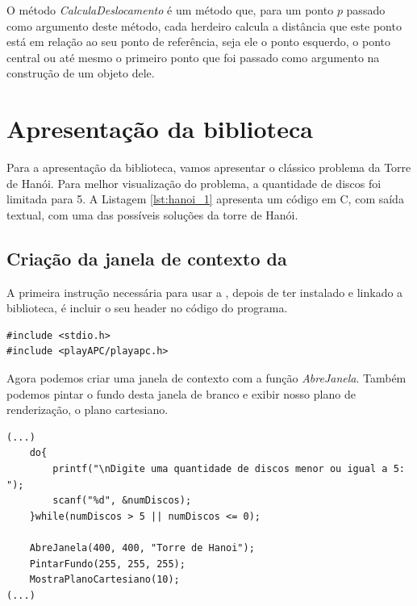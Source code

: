 O método \emph{CalculaDeslocamento} é um método que, para um ponto $p$ passado como argumento deste método, cada herdeiro calcula a distância que este ponto está em relação ao seu ponto de referência, seja ele o ponto esquerdo, o ponto central ou até mesmo o primeiro ponto que foi passado como argumento na construção de um objeto dele.






















\section{Apresentação da biblioteca} \label{sec:apresentacao}
Para a apresentação da biblioteca, vamos apresentar o clássico problema da Torre de Hanói. Para melhor visualização do problema, a quantidade de discos foi limitada para 5. A Listagem \ref{lst:hanoi_1} apresenta um código em C, com saída textual, com uma das possíveis soluções da torre de Hanói.

%


\subsection{Criação da janela de contexto da \playAPC}
A primeira instrução necessária para usar a \playAPC{}, depois de ter instalado e linkado a biblioteca, é incluir o seu header no código do programa.

 \begin{lstlisting}[caption={Incluir \playAPC{} no código.}, style=tuto] 
#include <stdio.h>
#include <playAPC/playapc.h>
\end{lstlisting}

Agora podemos criar uma janela de contexto com a função \emph{AbreJanela}. Também podemos pintar o fundo desta janela de branco e exibir nosso plano de renderização, o plano cartesiano.
 \begin{lstlisting}[caption={Abrir uma janela branca, mostrando o plano cartesiano.}, style=tuto] 
 (...)
    do{
        printf("\nDigite uma quantidade de discos menor ou igual a 5: ");
        scanf("%d", &numDiscos);
    }while(numDiscos > 5 || numDiscos <= 0);
    
    AbreJanela(400, 400, "Torre de Hanoi");
    PintarFundo(255, 255, 255);
    MostraPlanoCartesiano(10);
(...)
\end{lstlisting}

